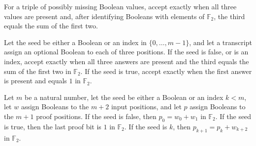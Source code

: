 \begin{definition}
\label{FABL.linearTripleTranscriptAccept}
\leanok
{}
For a triple of possibly missing Boolean values, accept exactly when all three values
are present and, after identifying Booleans with elements of $\mathbb{F}_2$, the
third equals the sum of the first two.
\end{definition}

\begin{definition}
\label{FABL.oddWeightPartialSumTranscriptAccept}
\leanok
{}
Let the seed be either a Boolean or an index in $\{0,\ldots,m-1\}$, and let a
transcript assign an optional Boolean to each of three positions. If the seed is false,
or is an index, accept exactly when all three answers are present and the third equals
the sum of the first two in $\mathbb{F}_2$. If the seed is true, accept exactly
when the first answer is present and equals $1$ in $\mathbb{F}_2$.
\end{definition}

\begin{definition}
\label{FABL.OddWeightPartialSumCheckHolds}
\leanok
{}
Let $m$ be a natural number, let the seed be either a Boolean or an index $k<m$, let $w$
assign Booleans to the $m+2$ input positions, and let $p$ assign Booleans to the $m+1$
proof positions. If the seed is false, then $p_0=w_0+w_1$ in $\mathbb{F}_2$. If
the seed is true, then the last proof bit is $1$ in $\mathbb{F}_2$. If the seed
is $k$, then $p_{k+1}=p_k+w_{k+2}$ in $\mathbb{F}_2$.
\end{definition}

